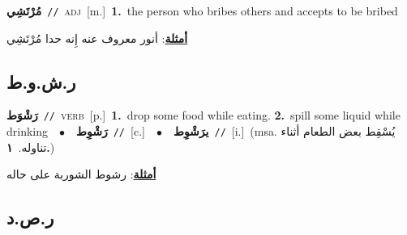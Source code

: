 \documentclass[10pt,a4paper,twoside]{article} %
\begin{document}
\begin{multicols}{2}
{\setlength\topsep{0pt}\textbf{\foreignlanguage{arabic}{مُرْتَشِي}}\ {\color{gray}\texttt{//}\color{black}}\ \textsc{adj}\ [m.]\ \textbf{1.}~the person who bribes others and accepts to be bribed\  \begin{flushright}\color{gray}\foreignlanguage{arabic}{\textbf{\underline{\foreignlanguage{arabic}{أمثلة}}}: أنور معروف عنه إِنه حدا مُرْتَشِي}\end{flushright}\color{black}} \vspace{2mm}

\vspace{-3mm}
\subsection*{\color{blue}\foreignlanguage{arabic}{ر.ش.و.ط}\color{blue}{}} 

{\setlength\topsep{0pt}\textbf{\foreignlanguage{arabic}{رَشْوَط}}\ {\color{gray}\texttt{//}\color{black}}\ \textsc{verb}\ [p.]\ \textbf{1.}~drop some food while eating.  \textbf{2.}~spill some liquid while drinking\ \ $\bullet$\ \ \setlength\topsep{0pt}\textbf{\foreignlanguage{arabic}{رَشْوِط}}\ {\color{gray}\texttt{//}\color{black}}\ [c.]\ \ $\bullet$\ \ \setlength\topsep{0pt}\textbf{\foreignlanguage{arabic}{يرَشْوِط}}\ {\color{gray}\texttt{//}\color{black}}\ [i.]\ \color{gray}(msa. \foreignlanguage{arabic}{يُسْقِط بعض الطعام أثناء تناوله.}~\foreignlanguage{arabic}{\textbf{١.}})\color{black}\  \begin{flushright}\color{gray}\foreignlanguage{arabic}{\textbf{\underline{\foreignlanguage{arabic}{أمثلة}}}: رشوط الشوربة على حاله}\end{flushright}\color{black}} \vspace{2mm}

\vspace{-3mm}
\subsection*{\color{blue}\foreignlanguage{arabic}{ر.ص.د}\color{blue}{}} 


\end{multicols}
\end{document}
